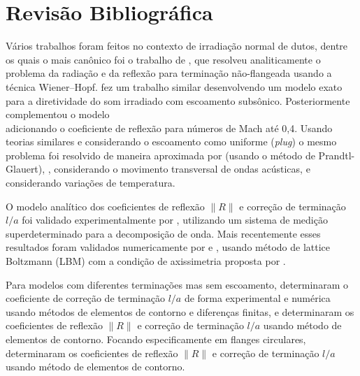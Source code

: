 \chapter{Revisão Bibliográfica}
\label{chapter:revisao}

Vários trabalhos foram feitos no contexto de irradiação normal de dutos, dentre os quais o mais canônico foi o trabalho de , que resolveu analiticamente o problema da radiação e da reflexão para terminação não-flangeada usando a técnica Wiener–Hopf.  fez um trabalho similar desenvolvendo um modelo exato para a diretividade do som irradiado com escoamento subsônico. Posteriormente  complementou o modelo \\ adicionando o coeficiente de reflexão para números de Mach até 0,4. Usando teorias similares e considerando o escoamento como uniforme (\textit{plug}) o mesmo problema foi resolvido de maneira aproximada por   (usando o método de Prandtl-Glauert), , considerando o movimento transversal de ondas acústicas, e  considerando variações de temperatura. 

O modelo analítico \cite{munt1990acoustic} dos coeficientes de reflexão $\|R\|$ e correção de terminação $l/a$ foi validado experimentalmente por , utilizando um sistema de medição superdeterminado para a decomposição de onda. Mais recentemente esses resultados foram validados numericamente por  e , usando método de lattice Boltzmann (LBM) com a condição de axissimetria proposta por . 

Para modelos com diferentes terminações mas sem escoamento,  determinaram o coeficiente de correção de terminação $l/a$ de forma experimental e numérica usando métodos de elementos de contorno e diferenças finitas, e  determinaram os coeficientes de reflexão $\|R\|$ e correção de terminação $l/a$ usando método de elementos de contorno. Focando especificamente em flanges circulares,  determinaram os coeficientes de reflexão $\|R\|$ e correção de terminação $l/a$ usando método de elementos de contorno.


